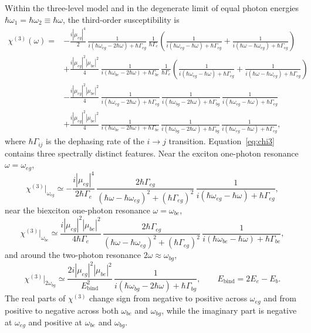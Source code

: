 Within the three-level model and in the degenerate limit of equal photon
energies $\hbar\omega_1=\hbar\omega_2\equiv\hbar\omega$, the third-order
susceptibility is~\cite{boyd}
\begin{align}
  \chi^{(3)}(\omega)
  ={}&-\frac{i|\mu_{eg}|^{4}}{2}\,
      \frac{1}{i(\hbar\omega_{eg}-2\hbar\omega)+\hbar\Gamma_{eg}}\,
      \frac{1}{\hbar\Gamma_e}
      \left(\frac{1}{i(\hbar\omega_{eg}-\hbar\omega)+\hbar\Gamma_{eg}}
      +\frac{1}{i(\hbar\omega-\hbar\omega_{eg})+\hbar\Gamma_{eg}}\right)
      \nonumber\\
  &+\frac{i|\mu_{eg}|^{2}|\mu_{be}|^{2}}{4}\,
      \frac{1}{i(\hbar\omega_{be}-2\hbar\omega)+\hbar\Gamma_{be}}\,
      \frac{1}{\hbar\Gamma_e}
      \left(\frac{1}{i(\hbar\omega_{eg}-\hbar\omega)+\hbar\Gamma_{eg}}
      +\frac{1}{i(\hbar\omega-\hbar\omega_{eg})+\hbar\Gamma_{eg}}\right)
      \nonumber\\
  &-\frac{i|\mu_{eg}|^{2}|\mu_{be}|^{2}}{4}\,
      \frac{1}{i(\hbar\omega_{eg}-2\hbar\omega)+\hbar\Gamma_{eg}}\,
      \frac{1}{i(\hbar\omega_{bg}-2\hbar\omega)+\hbar\Gamma_{bg}}\,
      \frac{1}{i(\hbar\omega_{eg}-\hbar\omega)+\hbar\Gamma_{eg}}
      \nonumber\\
  &+\frac{i|\mu_{eg}|^{2}|\mu_{be}|^{2}}{4}\,
      \frac{1}{i(\hbar\omega_{be}-2\hbar\omega)+\hbar\Gamma_{be}}\,
      \frac{1}{i(\hbar\omega_{bg}-2\hbar\omega)+\hbar\Gamma_{bg}}\,
      \frac{1}{i(\hbar\omega_{eg}-\hbar\omega)+\hbar\Gamma_{eg}} ,
  \label{eq:chi3}
\end{align}
where $\hbar\Gamma_{ij}$ is the dephasing rate of the $i\!\to\! j$ transition.
Equation~\eqref{eq:chi3} contains three spectrally distinct features. Near the
exciton one-photon resonance $\omega=\omega_{eg}$,
\begin{equation}
  \chi^{(3)}\big|_{\omega_{eg}}\simeq
  -\frac{i|\mu_{eg}|^{4}}{2\hbar\Gamma_e}\,
  \frac{2\hbar\Gamma_{eg}}{(\hbar\omega-\hbar\omega_{eg})^{2}+(\hbar\Gamma_{eg})^{2}}\,
  \frac{1}{i(\hbar\omega_{eg}-\hbar\omega)+\hbar\Gamma_{eg}},
  \label{eq:resEG}
\end{equation}
near the biexciton one-photon resonance $\omega=\omega_{be}$,
\begin{equation}
  \chi^{(3)}\big|_{\omega_{be}}\simeq
  \frac{i|\mu_{eg}|^{2}|\mu_{be}|^{2}}{4\hbar\Gamma_e}\,
  \frac{2\hbar\Gamma_{eg}}{(\hbar\omega-\hbar\omega_{eg})^{2}+(\hbar\Gamma_{eg})^{2}}\,
  \frac{1}{i(\hbar\omega_{be}-\hbar\omega)+\hbar\Gamma_{be}},
  \label{eq:resBE}
\end{equation}
and around the two-photon resonance $2\omega\approx\omega_{bg}$,
\begin{equation}
  \chi^{(3)}\big|_{2\omega_{bg}}\simeq
  \frac{2i|\mu_{eg}|^{2}|\mu_{be}|^{2}}{E_{\mathrm{bind}}^{2}}\,
  \frac{1}{i(\hbar\omega_{bg}-2\hbar\omega)+\hbar\Gamma_{bg}},
  \qquad
  E_{\mathrm{bind}}=2E_e-E_b .
  \label{eq:resBG}
\end{equation}
The real parts of $\chi^{(3)}$ change sign from negative to positive across
$\omega_{eg}$ and from positive to negative across both $\omega_{be}$ and
$\omega_{bg}$, while the imaginary part is negative at $\omega_{eg}$ and positive
at $\omega_{be}$ and $\omega_{bg}$.

